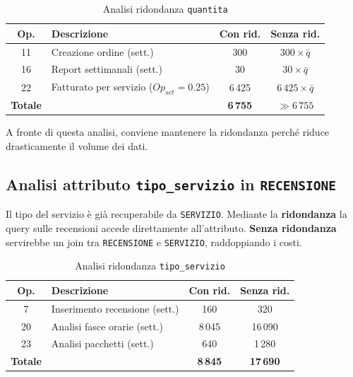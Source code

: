 \documentclass[a4paper,12pt]{report}
\begin{document}
\begin{table}[H]
	\centering
	\small
	\begin{tabular}{|c|l|c|c|}
		\hline
		\rowcolor{gray!20}
		\textbf{Op.}    & \textbf{Descrizione}                     & \textbf{Con rid.} & \textbf{Senza rid.}     \\
		\hline
		11              & Creazione ordine (sett.)                 & 300               & $300 \times \bar{q}$    \\
		16              & Report settimanali (sett.)               & 30                & $30 \times \bar{q}$     \\
		22              & Fatturato per servizio ($Op_{set}=0.25$) & 6\,425            & $6\,425 \times \bar{q}$ \\
		\hline
		\textbf{Totale} &                                          & \textbf{6\,755}   & $\gg 6\,755$            \\
		\hline
	\end{tabular}
	\caption{Analisi ridondanza \texttt{quantita}}
\end{table}

\noindent
A fronte di questa analisi, conviene mantenere la ridondanza perché riduce drasticamente il volume dei dati.

\subsection{Analisi attributo \texttt{tipo\_servizio} in \texttt{RECENSIONE}}
Il tipo del servizio è già recuperabile da \texttt{SERVIZIO}.
Mediante la \textbf{ridondanza} la query sulle recensioni accede direttamente all’attributo.
\textbf{Senza ridondanza} servirebbe un join tra \texttt{RECENSIONE} e \texttt{SERVIZIO}, raddoppiando i costi.

\begin{table}[H]
	\centering
	\small
	\begin{tabular}{|c|l|c|c|}
		\hline
		\rowcolor{gray!20}
		\textbf{Op.}    & \textbf{Descrizione}           & \textbf{Con rid.} & \textbf{Senza rid.} \\
		\hline
		7               & Inserimento recensione (sett.) & 160               & 320                 \\
		20              & Analisi fasce orarie (sett.)   & 8\,045            & 16\,090             \\
		23              & Analisi pacchetti (sett.)      & 640               & 1\,280              \\
		\hline
		\textbf{Totale} &                                & \textbf{8\,845}   & \textbf{17\,690}    \\
		\hline
	\end{tabular}
	\caption{Analisi ridondanza \texttt{tipo\_servizio}}
\end{table}
\end{document}
